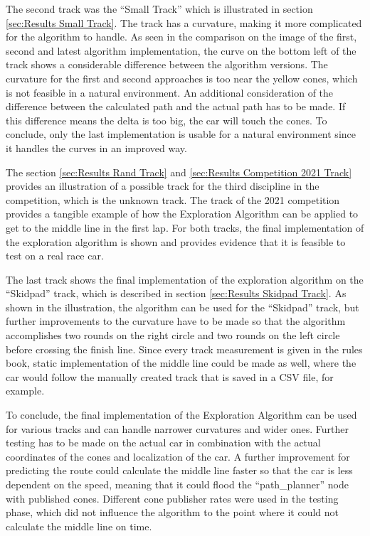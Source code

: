 The second track was the ``Small Track'' which is illustrated in section \ref{sec:Results Small Track}. The track has a curvature, making it more complicated for the algorithm to handle. As seen in the comparison on the image of the first, second and latest algorithm implementation, the curve on the bottom left of the track shows a considerable difference between the algorithm versions. The curvature for the first and second approaches is too near the yellow cones, which is not feasible in a natural environment. An additional consideration of the difference between the calculated path and the actual path has to be made. If this difference means the delta is too big, the car will touch the cones. To conclude, only the last implementation is usable for a natural environment since it handles the curves in an improved way.

The section \ref{sec:Results Rand Track} and \ref{sec:Results Competition 2021 Track} provides an illustration of a possible track for the third discipline in the competition, which is the unknown track. The track of the 2021 competition provides a tangible example of how the Exploration Algorithm can be applied to get to the middle line in the first lap. For both tracks, the final implementation of the exploration algorithm is shown and provides evidence that it is feasible to test on a real race car.

The last track shows the final implementation of the exploration algorithm on the ``Skidpad'' track, which is described in section \ref{sec:Results Skidpad Track}. As shown in the illustration, the algorithm can be used for the ``Skidpad'' track, but further improvements to the curvature have to be made so that the algorithm accomplishes two rounds on the right circle and two rounds on the left circle before crossing the finish line. Since every track measurement is given in the rules book, static implementation of the middle line could be made as well, where the car would follow the manually created track that is saved in a CSV file, for example.

To conclude, the final implementation of the Exploration Algorithm can be used for various tracks and can handle narrower curvatures and wider ones. Further testing has to be made on the actual car in combination with the actual coordinates of the cones and localization of the car. A further improvement for predicting the route could calculate the middle line faster so that the car is less dependent on the speed, meaning that it could flood the ``path\_planner'' node with published cones. Different cone publisher rates were used in the testing phase, which did not influence the algorithm to the point where it could not calculate the middle line on time.

